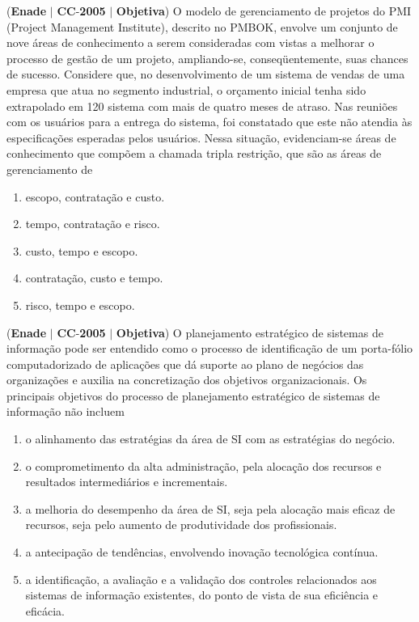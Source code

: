 \documentclass{exam}
\begin{document}
\begin{questions}
\question (\textbf{Enade} $|$ \textbf{CC}-\textbf{2005} $|$ \textbf{Objetiva})
O modelo de gerenciamento de projetos do PMI
(Project Management Institute), descrito no PMBOK, envolve
um conjunto de nove áreas de conhecimento a serem
consideradas com vistas a melhorar o processo de gestão de
um projeto, ampliando-se, conseqüentemente, suas chances
de sucesso. Considere que, no desenvolvimento de um
sistema de vendas de uma empresa que atua no segmento
industrial, o orçamento inicial tenha sido extrapolado em
120%
sistema com mais de quatro meses de atraso. Nas reuniões
com os usuários para a entrega do sistema, foi constatado que
este não atendia às especificações esperadas pelos usuários.
Nessa situação, evidenciam-se áreas de conhecimento que
compõem a chamada tripla restrição, que são as áreas de
gerenciamento de
	\begin{enumerate}[label=\alph*)]
		\item  escopo, contratação e custo.
		\item  tempo, contratação e risco.
		\item  custo, tempo e escopo.
		\item  contratação, custo e tempo.
		\item  risco, tempo e escopo.
	\end{enumerate}

\question (\textbf{Enade} $|$ \textbf{CC}-\textbf{2005} $|$ \textbf{Objetiva})
O planejamento estratégico de sistemas de informação pode ser
entendido como o processo de identificação de um porta-fólio
computadorizado de aplicações que dá suporte ao plano de
negócios das organizações e auxilia na concretização dos objetivos
organizacionais. Os principais objetivos do processo de
planejamento estratégico de sistemas de informação não incluem
	\begin{enumerate}[label=\alph*)]
		\item  o alinhamento das estratégias da área de SI com as estratégias
do negócio.
		\item  o comprometimento da alta administração, pela alocação dos
recursos e resultados intermediários e incrementais.
		\item  a melhoria do desempenho da área de SI, seja pela alocação
mais eficaz de recursos, seja pelo aumento de produtividade
dos profissionais.
		\item  a antecipação de tendências, envolvendo inovação tecnológica
contínua.
		\item  a identificação, a avaliação e a validação dos controles
relacionados aos sistemas de informação existentes, do ponto
de vista de sua eficiência e eficácia.
	\end{enumerate}


\end{questions}
\end{document}
